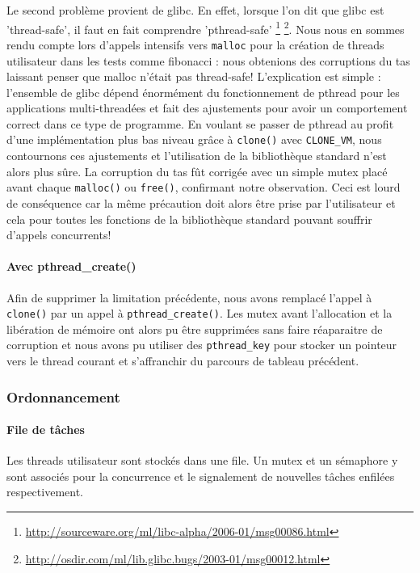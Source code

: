 Le second problème provient de glibc. En effet, lorsque l'on dit que glibc est
'thread-safe', il faut en fait comprendre 'pthread-safe'
\footnote{\url{http://sourceware.org/ml/libc-alpha/2006-01/msg00086.html}}
\footnote{\url{http://osdir.com/ml/lib.glibc.bugs/2003-01/msg00012.html}}.
Nous nous en sommes rendu compte lors d'appels intensifs vers \verb!malloc!
pour la création de threads utilisateur dans les tests comme fibonacci : nous
obtenions des corruptions du tas laissant penser que malloc n'était pas
thread-safe!  L'explication est simple : l'ensemble de glibc dépend énormément
du fonctionnement de pthread pour les applications multi-threadées et fait des
ajustements pour avoir un comportement correct dans ce type de programme. En
voulant se passer de pthread au profit d'une implémentation plus bas niveau
grâce à \verb!clone()! avec \verb!CLONE_VM!, nous contournons ces ajustements
et l'utilisation de la bibliothèque standard n'est alors plus sûre. La
corruption du tas fût corrigée avec un simple mutex placé avant chaque
\verb!malloc()! ou \verb!free()!, confirmant notre observation. Ceci est lourd
de conséquence car la même précaution doit alors être prise par l'utilisateur
et cela pour toutes les fonctions de la bibliothèque standard pouvant souffrir
d'appels concurrents!


\paragraph{Avec pthread\_create()}
Afin de supprimer la limitation précédente, nous avons remplacé l'appel à \verb!clone()! par un appel à \verb!pthread_create()!. Les mutex avant l'allocation et la libération de mémoire ont alors pu être supprimées sans faire réaparaitre de corruption et nous avons pu utiliser des \verb!pthread_key! pour stocker un pointeur vers le thread courant et s'affranchir du parcours de tableau précédent.


\subsubsection{Ordonnancement}

\paragraph{File de tâches} Les threads utilisateur sont stockés dans une file. Un mutex et un sémaphore y sont associés pour la concurrence et le signalement de nouvelles tâches enfilées respectivement.

